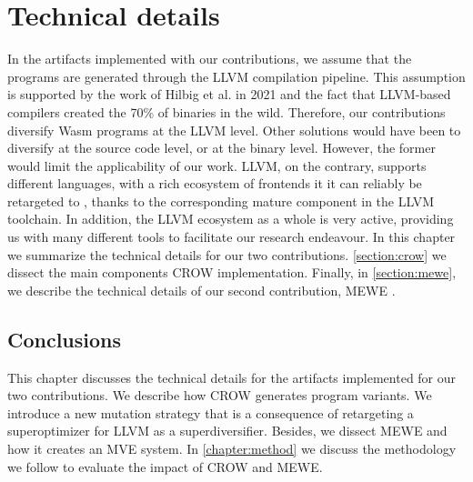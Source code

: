 \chapter{Technical details}
\label{chapter:technical}

In the artifacts implemented with our contributions, we assume that the \wasm programs are generated through the LLVM compilation pipeline. This assumption is supported by the work of Hilbig et al. \cite{Hilbig2021AnES} in 2021 and the fact that LLVM-based compilers created the 70\% of \wasm binaries in the wild. Therefore,
our contributions diversify Wasm programs at the LLVM level. Other solutions would have been to diversify at the source code level, or at the \wasm binary level. However, the former would limit the applicability of our work. 
LLVM, on the contrary, supports different languages, with a rich ecosystem of frontends it it can reliably be retargeted to \wasm, thanks to the corresponding mature component in the LLVM toolchain. In addition, the LLVM ecosystem as a whole is very active, providing us with many different tools to facilitate our research endeavour.
In this chapter we summarize the technical details for our two contributions. \autoref{section:crow} we dissect the main components CROW \cite{CROW} implementation. Finally, in \autoref{section:mewe}, we describe the technical details of our second contribution, MEWE \cite{MEWE}.








\section*{Conclusions}

This chapter discusses the technical details for the artifacts implemented for our two contributions.
We describe how CROW generates program variants.
We introduce a new mutation strategy that is a consequence of retargeting a superoptimizer for LLVM as a superdiversifier.
Besides, we dissect MEWE and how it creates an MVE system.
In \autoref{chapter:method} we discuss the methodology we follow to evaluate the impact of CROW and MEWE.